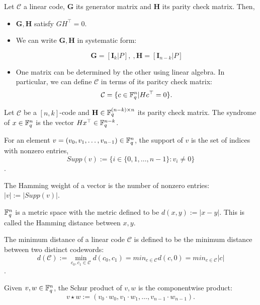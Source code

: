 \begin{remark}
Let $\mathcal{C}$ a linear code, $\mathbf{G}$ its generator matrix and $\mathbf{H}$ its parity check matrix. Then,

\begin{itemize}
\item $\mathbf{G},\mathbf{H}$ satisfy $GH^\top = 0$.
\item We can write $\mathbf{G},\mathbf{H}$ in systematic form:

\[
\mathbf{G} = [ \mathbf{I}_k | P] , \ , \mathbf{H} = [ \mathbf{I}_{n-k} | P]
\]

\item One matrix can be determined by the other using linear algebra. In particular, we can define $\mathcal{C}$ in terms of its paritcy check matrix: \[\mathcal{C} = \{c \in \mathbb{F}_q^n | Hc^\top = 0 \}.\]
\end{itemize}
\end{remark}

\begin{defn}
Let $\mathcal{C}$ be a $[n,k]$-code and $\mathbf{H} \in \mathbb{F}_q^{(n-k)\times n}$ its parity check matrix. The syndrome of $x \in \mathbb{F}_q^n$ is the vector $Hx^\top \in \mathbb{F}_q^{n-k}$.

\end{defn}

\begin{defn}
For an element $v = (v_0, v_1, \ldots, v_{n-1}) \in \mathbb{F}_q^n$, the support of $v$ is the set of indices with nonzero entries, \[Supp(v) := \{ i \in \{ 0, 1, \ldots, n-1 \} : v_i \neq 0 \}\].

The Hamming weight of a vector is the number of nonzero entries: $|v| := | Supp(v) |$.
\end{defn}

\begin{defn}
$\mathbb{F}_q^n$ is a metric space with the metric defined to be $d(x,y) := | x - y |$. This is called the Hamming distance between $x,y$.
\end{defn}

\begin{defn}
The minimum distance of a linear code $\mathcal{C}$ is defined to be the minimum distance between two distinct codewords: \[d(\mathcal{C}) := \min_{c_0, c_1 \in \mathcal{C}} d(c_0,c_1) = min_{c \in \mathcal{C}} d(c,0) = min_{c \in \mathcal{C}} |c|\].
\end{defn}

\begin{defn}
Given $v, w \in \mathbb{F}_q^n$, the Schur product of $v,w$ is the componentwise product: \[v \star w:= (v_0 \cdot w_0, v_1 \cdot w_1, \ldots , v_{n-1} \cdot w_{n-1}).\]
\end{defn}

